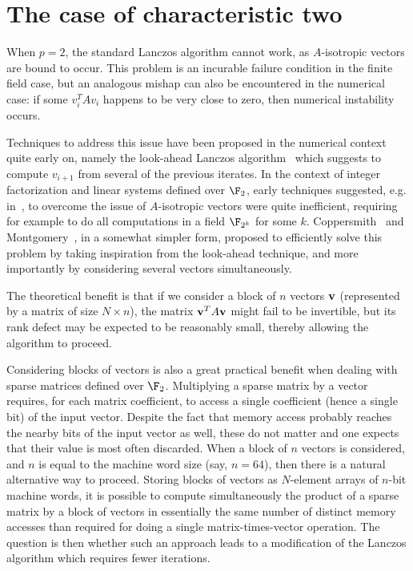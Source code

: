 \section{The case of characteristic two}
\label{sec:blocklanczos:char2}
When $p=2$, the standard Lanczos algorithm cannot work, as $A$-isotropic
vectors are bound to occur.  This problem is an incurable failure
condition in the finite field case, but an analogous mishap can also be
encountered in the numerical case: if some $v_i^TAv_i$ happens to be very
close to zero, then numerical instability occurs.

Techniques to address this issue have been proposed in the numerical
context quite early on, namely the look-ahead Lanczos
algorithm~\cite{PaTaLi85} which suggests to compute $v_{i+1}$ from
several of the previous iterates.
In the context of integer factorization and
linear systems defined over $\F_2$, early techniques suggested, e.g.
in~\cite{C:LaMOdl90a}, to overcome the issue of $A$-isotropic vectors
were quite inefficient, requiring for example to do all computations in
a field $\F_{2^k}$ for some $k$.
Coppersmith~\cite{Coppersmith93a} and Montgomery~\cite{EC:Montgomery95},
in a somewhat simpler form, proposed to efficiently solve this problem by
taking inspiration from the look-ahead technique, and more importantly by
considering several vectors simultaneously.

The theoretical benefit is that if
we consider a block of $n$ vectors $\mathbf{v} $ (represented by a
matrix of size $N\times n$), the matrix $\mathbf{v} ^TA\mathbf{v} $ might
fail to be invertible, but its rank defect may be expected to be
reasonably small, thereby allowing the algorithm to proceed.

Considering blocks of vectors is also a great practical benefit when
dealing with sparse matrices defined over $\F_2$. Multiplying a sparse
matrix by a vector requires, for each matrix coefficient, to access a
single coefficient (hence a single bit) of the input vector. Despite the
fact that memory access probably reaches the nearby bits of the input
vector as well, these do not matter and one expects that their value is
most often discarded. When a block of $n$ vectors is considered, and $n$
is equal to the machine word size (say, $n=64$), then there is a
natural alternative way to proceed. Storing blocks of vectors as
$N$-element arrays of $n$-bit machine words, it is possible to compute
simultaneously the product of a sparse matrix by a block of vectors in
essentially the same number of distinct memory accesses than required for
doing a single matrix-times-vector operation. The question is then
whether such an approach leads to a modification of the Lanczos algorithm
which requires fewer iterations.

